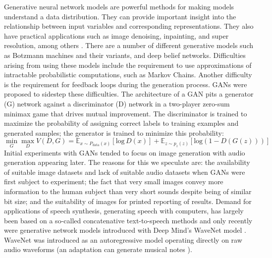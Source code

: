 \documentclass[a4paper, dvipsnames, titlepage]{article}
\begin{document}
Generative neural network models are powerful methods for making models understand a data distribution.
They can provide important insight into the relationship between input variables and corresponding representations.
They also have practical applications such as image denoising, inpainting, and super resolution, among others \citep{openai_blog_2017}.
\newline
\newline
There are a number of different generative models such as Botzmann machines and their variants, and deep belief networks.
Difficulties arising from using these models include the requirement to use approximations of intractable probabilistic computations, such as Markov Chains.
Another difficulty is the requirement for feedback loops during the generation process.
GANs were proposed to sidestep these difficulties.
\newline
\newline
The architecture of a GAN pits a generator (G) network against a discriminator (D) network in a two-player zero-sum minimax game that drives mutual improvement.
The discriminator is trained to maximize the probability of assigning correct labels to training examples and generated samples; the generator is trained to minimize this probability:
\begin{equation}
  \min_{G} \max_{D} V(D,G) = \mathbb{E}_{x \sim P_\mathrm{data}(x)}[\mathrm{log}\,D(x)] + \mathbb{E}_{z \sim p_z(z)}[\mathrm{log} (1 - D(G(z)))]
\end{equation}
\newline
\newline
Initial experiments with GANs tended to focus on image generation with audio generation appearing later.
The reasons for this we speculate are: the availability of suitable image datasets and lack of suitable audio datasets when GANs were first subject to experiment; the fact that very small images convey more information to the human subject than very short sounds despite being of similar bit size; and the suitability of images for printed reporting of results.
\newline
\newline
Demand for applications of speech synthesis, generating speech with computers, has largely been based on a so-called concatenative text-to-speech methods and only recently were generative network models introduced with Deep Mind's WaveNet model \citep{waveNetUrl}.
WaveNet was introduced as an autoregressive model operating directly on raw audio waveforms \citep{DBLP:journals/corr/OordDZSVGKSK16} (an adaptation can generate musical notes \citep{2017arXiv170401279E}).
\end{document}
